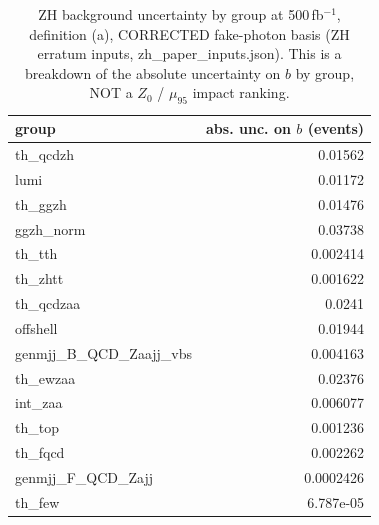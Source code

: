 \begin{table}[ht]\centering\small
\begin{tabular}{lr}\hline
group & abs. unc. on $b$ (events) \\\hline
th\_qcdzh & 0.01562 \\
lumi & 0.01172 \\
th\_ggzh & 0.01476 \\
ggzh\_norm & 0.03738 \\
th\_tth & 0.002414 \\
th\_zhtt & 0.001622 \\
th\_qcdzaa & 0.0241 \\
offshell & 0.01944 \\
genmjj\_B\_QCD\_Zaajj\_vbs & 0.004163 \\
th\_ewzaa & 0.02376 \\
int\_zaa & 0.006077 \\
th\_top & 0.001236 \\
th\_fqcd & 0.002262 \\
genmjj\_F\_QCD\_Zajj & 0.0002426 \\
th\_few & 6.787e-05 \\\hline
\end{tabular}
\caption{ZH background uncertainty by group at 500\,fb$^{-1}$, definition (a), CORRECTED fake-photon basis (ZH erratum inputs, zh\_paper\_inputs.json). This is a breakdown of the absolute uncertainty on $b$ by group, NOT a $Z_0$ / $\mu_{95}$ impact ranking.}
\end{table}
